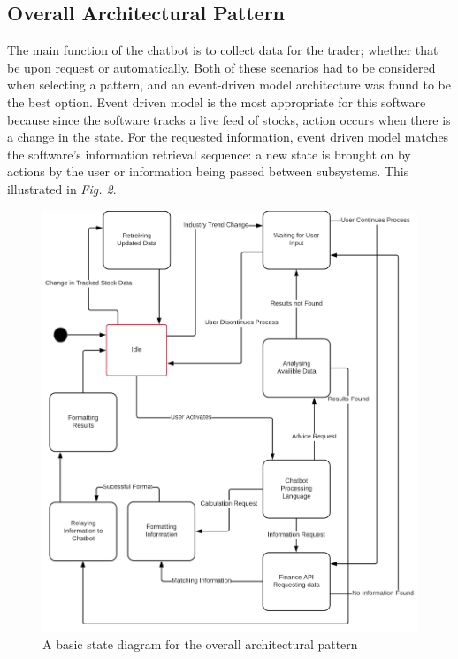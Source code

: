\documentclass[]{IEEEtran}
\begin{document}
\subsection{Overall Architectural Pattern}
The main function of the chatbot is to collect data for the trader; whether that be upon request or automatically. Both of these scenarios had to be considered when selecting a pattern, and an event-driven model architecture was found to be the best option. Event driven model is the most appropriate for this software because since the software tracks a live feed of stocks, action occurs when there is a change in the state. For the requested information, event driven model matches the software’s information retrieval sequence: a new state is brought on by actions by the user or information being passed between subsystems. This illustrated in \textit{Fig. 2}.

\begin{figure}
\includegraphics[scale=0.12]{BasicStateDiagram}
\caption{A basic state diagram for the overall architectural pattern}
\end{figure}
\end{document}
